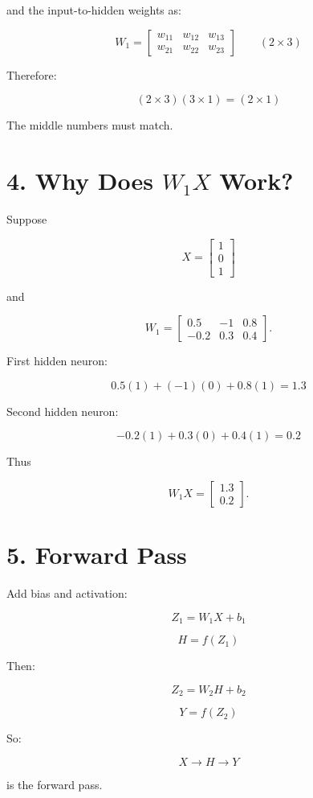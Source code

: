 \documentclass[11pt]{article}
\begin{document}
and the input-to-hidden weights as:

\[
W_1=
\begin{bmatrix}
w_{11}&w_{12}&w_{13}\\
w_{21}&w_{22}&w_{23}
\end{bmatrix}
\qquad (2\times3)
\]

Therefore:

\[
\boxed{(2\times3)(3\times1)=(2\times1)}
\]

The middle numbers must match.

\section*{4. Why Does $W_1X$ Work?}

Suppose

\[
X=
\begin{bmatrix}
1\\0\\1
\end{bmatrix}
\]

and

\[
W_1=
\begin{bmatrix}
0.5&-1&0.8\\
-0.2&0.3&0.4
\end{bmatrix}.
\]

First hidden neuron:

\[
0.5(1)+(-1)(0)+0.8(1)=1.3
\]

Second hidden neuron:

\[
-0.2(1)+0.3(0)+0.4(1)=0.2
\]

Thus

\[
W_1X=
\begin{bmatrix}
1.3\\0.2
\end{bmatrix}.
\]

\section*{5. Forward Pass}

Add bias and activation:

\[
Z_1=W_1X+b_1
\]

\[
H=f(Z_1)
\]

Then:

\[
Z_2=W_2H+b_2
\]

\[
Y=f(Z_2)
\]

So:

\[
\boxed{X\rightarrow H\rightarrow Y}
\]

is the forward pass.
\end{document}
